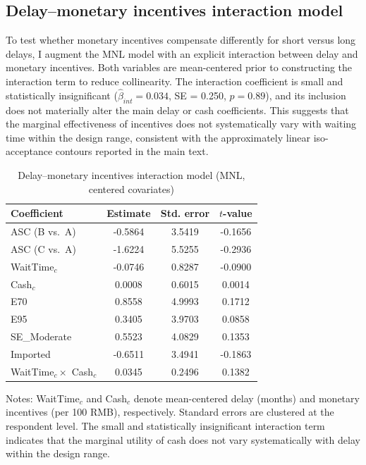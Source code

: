 \documentclass[doublespacing]{utdthesis}
\begin{document}
\subsection{Delay--monetary incentives interaction model}
To test whether monetary incentives compensate differently for short versus long delays, I augment the MNL model with an explicit interaction between delay and monetary incentives. Both variables are mean-centered prior to constructing the interaction term to reduce collinearity. The interaction coefficient is small and statistically insignificant ($\hat{\beta}_{int}=0.034$, SE = 0.250, $p=0.89$), and its inclusion does not materially alter the main delay or cash coefficients. This suggests that the marginal effectiveness of incentives does not systematically vary with waiting time within the design range, consistent with the approximately linear iso-acceptance contours reported in the main text.

\begin{table}[htbp]
\centering
\caption{Delay--monetary incentives interaction model (MNL, centered covariates)}
\label{tab:essay2_interaction}
\begin{threeparttable}
\begin{tabular}{lccc}
\toprule
Coefficient & Estimate & Std. error & $t$-value \\
\midrule
ASC (B vs.\ A) & -0.5864 & 3.5419 & -0.1656 \\
ASC (C vs.\ A) & -1.6224 & 5.5255 & -0.2936 \\
WaitTime$_c$ & -0.0746 & 0.8287 & -0.0900 \\
Cash$_c$ & 0.0008 & 0.6015 & 0.0014 \\
E70 & 0.8558 & 4.9993 & 0.1712 \\
E95 & 0.3405 & 3.9703 & 0.0858 \\
SE\_Moderate & 0.5523 & 4.0829 & 0.1353 \\
Imported & -0.6511 & 3.4941 & -0.1863 \\
WaitTime$_c \times$ Cash$_c$ & 0.0345 & 0.2496 & 0.1382 \\
\bottomrule
\end{tabular}
\begin{tablenotes}
\footnotesize
\item Notes: WaitTime$_c$ and Cash$_c$ denote mean-centered delay (months) and monetary incentives (per 100 RMB), respectively. Standard errors are clustered at the respondent level. The small and statistically insignificant interaction term indicates that the marginal utility of cash does not vary systematically with delay within the design range.
\end{tablenotes}
\end{threeparttable}
\end{table}
\end{document}
